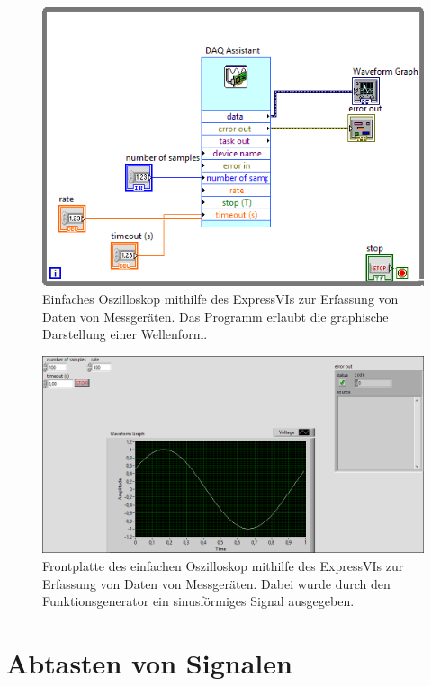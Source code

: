 \documentclass[
a4paper,
12pt,
pagesize,
ngerman
]{scrartcl}
\begin{document}
	\begin{figure}[H]  
		\includegraphics[width=1\textwidth]{EIRE2018Dateien/Tag2/expressVI_1d}
		\centering
		\caption{
			Einfaches Oszilloskop mithilfe des ExpressVIs zur Erfassung von Daten von Messgeräten. Das Programm erlaubt die graphische Darstellung einer Wellenform.
		}
		\label{fig_tag2_oszi_express_block}
		\centering
	\end{figure}
	\begin{figure}[H]  
		\includegraphics[width=1\textwidth]{EIRE2018Dateien/Tag2/expressVI_1p}
		\centering
		\caption{
			Frontplatte des einfachen Oszilloskop mithilfe des ExpressVIs zur Erfassung von Daten von Messgeräten. Dabei wurde durch den Funktionsgenerator ein sinusförmiges Signal ausgegeben.
		}
		\label{fig_tag2_oszi_express_front}
	\centering
	\end{figure}
	
	
	\section{Abtasten von Signalen}
	
\end{document}
